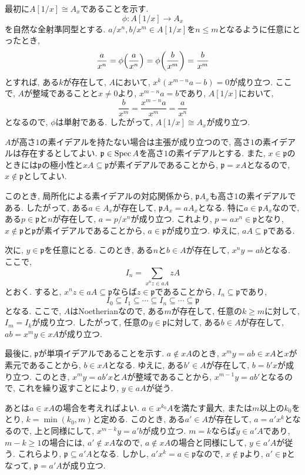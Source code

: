 \documentclass[dvipdfmx]{jsarticle}
\begin{document}
    最初に$A[1/x] \cong A_x$であることを示す.
    \[
        \phi: A[1/x] \longrightarrow A_x
    \]
    を自然な全射準同型とする.
    $a/x^n, b/x^m \in A[1/x]$を$n \leq m$となるように任意にとったとき,
    \[
        \frac{a}{x^n} = \phi\qty(\frac{a}{x^n}) = \phi\qty(\frac{b}{x^m}) = \frac{b}{x^m}
    \]
    とすれば, ある$k$が存在して, $A$において, $x^k(x^{m-n}a-b) = 0$が成り立つ.
    ここで, $A$が整域であることと$x \neq 0$より, $x^{m-n}a = b$であり,
    $A[1/x]$において,
    \[
        \frac{b}{x^m} = \frac{x^{m-n}a}{x^m} = \frac{a}{x^n}
    \]
    となるので, $\phi$は単射である.
    したがって, $A[1/x] \cong A_x$が成り立つ.

    $A$が高さ$1$の素イデアルを持たない場合は主張が成り立つので, 高さ$1$の素イデアルは存在するとしてよい.
    $\mathfrak{p} \in \operatorname{Spec}{A}$を高さ$1$の素イデアルとする.
    また, $x \in \mathfrak{p}$のときには$\mathfrak{p}$の極小性と$xA \subseteq \mathfrak{p}$が素イデアルであることから,
    $\mathfrak{p} = xA$となるので, $x \notin \mathfrak{p}$としてよい.

    このとき, 局所化による素イデアルの対応関係から, $\mathfrak{p}A_x$も高さ$1$の素イデアルである.
    したがって, ある$a \in A_x$が存在して, $\mathfrak{p}A_x = aA_x$となる.
    特に$a \in \mathfrak{p}A_x$なので, ある$p \in \mathfrak{p}$と$n$が存在して, $a = p/x^n$が成り立つ.
    これより, $p = ax^n \in \mathfrak{p}$となり, $x \notin \mathfrak{p}$と$\mathfrak{p}$が素イデアルであることから,
    $a \in \mathfrak{p}$が成り立つ.
    ゆえに, $aA \subseteq \mathfrak{p}$である.

    次に, $y \in \mathfrak{p}$を任意にとる.
    このとき, ある$n$と$b \in A$が存在して, $x^ny = ab$となる.
    ここで,
    \[
        I_n = \sum_{x^nz \in aA} zA
    \]
    とおく.
    すると, $x^nz \in aA \subseteq \mathfrak{p}$ならば$z \in \mathfrak{p}$であることから,
    $I_n \subseteq \mathfrak{p}$であり,
    \[
        I_0 \subseteq I_1 \subseteq \cdots \subseteq I_n \subseteq \cdots \subseteq \mathfrak{p}
    \]
    となる.
    ここで, $A$はNoetherianなので, ある$m$が存在して, 任意の$k \geq m$に対して, $I_m = I_k$が成り立つ.
    したがって, 任意の$y \in \mathfrak{p}$に対して, ある$b \in A$が存在して,
    $ab = x^my \in xA$が成り立つ.

    最後に, $\mathfrak{p}$が単項イデアルであることを示す.
    $a \notin xA$のとき, $x^my = ab \in xA$と$x$が素元であることから, $b \in xA$となる.
    ゆえに, ある$b' \in A$が存在して, $b = b'x$が成り立つ.
    このとき, $x^my = ab'x$と$A$が整域であることから, $x^{m-1}y  = ab'$となるので, これを繰り返すことにより,
    $y \in aA$が従う.

    あとは$a \in xA$の場合を考えればよい.
    $a \in x^{k_0}A$を満たす最大, または$m$以上の$k_0$をとり, $k = \min(k_0, m)$と定める.
    このとき, ある$a' \in A$が存在して, $a = a'x^k$となるので, 上と同様にして,
    $x^{m-k}y = a'b$が成り立つ.
    $m = k$ならば$y \in a'A$であり,
    $m - k \geq 1$の場合には, $a' \notin xA$なので, $a \notin xA$の場合と同様にして,
    $y \in a'A$が従う.
    これらより, $\mathfrak{p} \subseteq a'A$となる.
    しかし, $a'x^k = a \in \mathfrak{p}$なので, $x \notin \mathfrak{p}$より, $a' \in \mathfrak{p}$となって,
    $\mathfrak{p} = a'A$が成り立つ.
\end{document}
